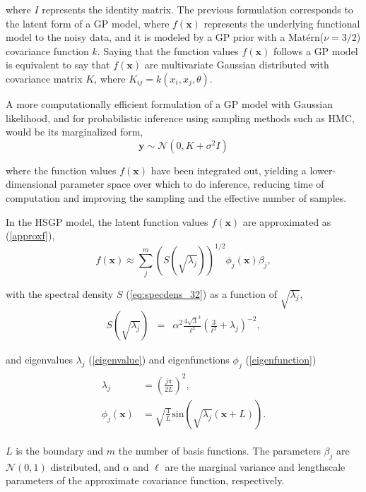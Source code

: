 \documentclass[]{interact}
\theoremstyle{plain}%
\theoremstyle{definition}
\theoremstyle{remark}
\begin{document}
\noindent where $I$ represents the identity matrix. The previous formulation corresponds to the latent form of a GP model, where $f(\bm{x})$ represents the underlying functional model to the noisy data, and it is modeled by a GP prior with a Mat{\'e}rn($\nu=3/2$) covariance function $k$. Saying that the function values $f(\bm{x})$ follows a GP model is equivalent to say that $f(\bm{x})$ are multivariate Gaussian distributed with covariance matrix $K$, where $K_{ij}=k(x_i,x_j,\theta)$.
 
A more computationally efficient formulation of a GP model with Gaussian likelihood, and for probabilistic inference using sampling methods such as HMC, would be its marginalized form,
%
\begin{equation*}\label{eq:marginalizedgp_simudata1}
\bm{y} \sim \mathcal{N}(0, K + \sigma^2 I )
\end{equation*}

\noindent where the function values $f(\bm{x})$ have been integrated out, yielding a lower-dimensional parameter space over which to do inference, reducing time of computation and improving the sampling and the effective number of samples.

In the HSGP model, the latent function values $f(\bm{x})$ are approximated as (\ref{approxf}),
%
\begin{equation*}
f(\bm{x}) \approx \sum_{j}^m \left( S(\sqrt{\lambda_j})\right)^{1/2} \phi_j(\bm{x}) \beta_j,
\end{equation*}

\noindent with the spectral density $S$ (\ref{eq:specdens_32}) as a function of $\sqrt{\lambda_j}$,
%
\begin{eqnarray*}
S(\sqrt{\lambda_j})&=& \alpha^2 \frac{4\sqrt{3}^{3}}{\ell^3}(\frac{3}{\ell^2} + \lambda_j)^{-2}, 
\end{eqnarray*}

\noindent and eigenvalues $\lambda_j$ (\ref{eigenvalue}) and eigenfunctions $\phi_j$ (\ref{eigenfunction})
%
\begin{eqnarray*}
\begin{split}
\lambda_j&=\left(\frac{j\pi}{2L}\right)^2, \\
\phi_j(\bm{x})&=\sqrt{\frac{1}{L}} \text{sin}\left(\sqrt{\lambda_j}(\bm{x}+L)\right).
\end{split}
\end{eqnarray*} 

\noindent $L$ is the boundary and $m$ the number of basis functions. The parameters $\beta_j$ are $\mathcal{N}(0,1)$ distributed, and $\alpha$ and $\ell$ are the marginal variance and lengthscale parameters of the approximate covariance function, respectively.
\end{document}
